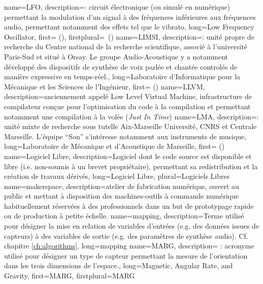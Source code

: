 {
    name={LFO},
    description={\textit{}: circuit électronique (ou simulé en numérique) permettant la modulation d'un signal à des fréquences inférieures aux fréquences audio, permettant notamment des effets tel que le vibrato},
    long={Low Frequency Oscillator},
    first={ ()},
    firstplural={\glspluralsuffix\ (\glspluralsuffix)}
}
{
    name={LIMSI},
    description={\textit{}: unité propre de recherche du Centre national de la recherche scientifique, associé à l'université Paris-Sud et situé à Orsay. Le groupe Audio-Acoustique y a notamment développé des dispositifs de synthèse de voix parlée et chantée controlés de manière expressive en temps-réel.},
    long={Laboratoire d'Informatique pour la Mécanique et les Sciences de l'Ingénieur},
    first={ ()}
}
{
    name={LLVM},
    description={anciennement appelé Low Level Virtual Machine, infrastructure de compilateur conçue pour l'optimisation du code à la compilation et permettant notamment une compilation à la volée (\textit{Just In Time})}
}
{
    name={LMA},
    description={\textit{}: unité mixte de recherche sous tutelle Aix-Marseille Université, CNRS et Centrale Marseille. L'équipe ``Son'' s'intéresse notamment aux instruments de musique},
    long={Laboratoire de Mécanique et d'Acoustique de Marseille},
    first={ ()}
}
{
    name={Logiciel Libre},
    description={Logiciel dont le code source est disponible et libre (i.e. non-soumis à un brevet propriétaire), permettant sa redistribution et la création de travaux dérivés},
    long={Logiciel Libre},
    plural={Logiciels Libres}
}
{
    name={makerspace},
    description={atelier de fabrication numérique, ouvert au public et mettant à disposition des machines-outils à commande numérique habituellement réservées à des professionnels dans un but de prototypage rapide ou de production à petite échelle.}
}
{
    name={mapping},
    description={Terme utilisé pour désigner la mise en relation de variables d'entrées (e.g. des données issues de capteurs) à des variables de sortie (e.g. des paramètres de synthèse audio). Cf. chapitre \ref{ch:algorithms}},
    long={mapping}
}
{
    name={MARG},
    description={\textit{} : acronyme utilisé pour désigner un type de capteur permettant la mesure de l'orientation dans les trois dimensions de l'espace.},
    long={Magnetic, Angular Rate, and Gravity},
    first={MARG},
    firstplural={MARG}
}
